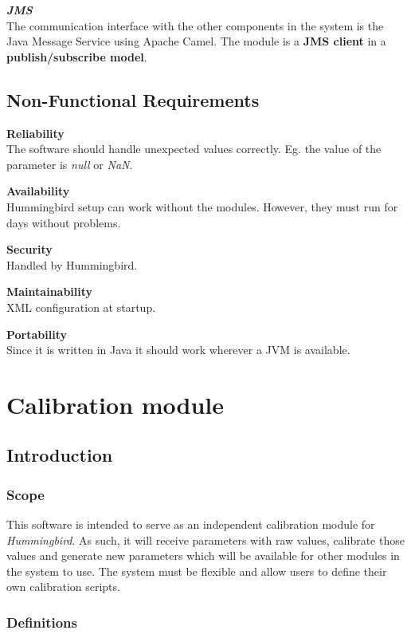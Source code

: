 \textbf{\emph{JMS}} \cite{JMS}\\
The communication interface with the other components in the system is the Java Message Service using Apache Camel. The module is a \textbf{JMS client} in a \textbf{publish/subscribe model}.

\subsection{Non-Functional Requirements}

\textbf{Reliability}\\
The software should handle unexpected values correctly. Eg. the value of the parameter is \emph{null} or \emph{NaN}.

\textbf{Availability}\\
Hummingbird setup can work without the modules. However, they must run for days without problems.

\textbf{Security}\\
Handled by Hummingbird.

\textbf{Maintainability}\\
XML configuration at startup.

\textbf{Portability}\\
Since it is written in Java it should work wherever a JVM is available.

\section{Calibration module}

\subsection{Introduction}

\subsubsection{Scope}

This software is intended to serve as an independent calibration module for \emph{Hummingbird}. As such, it will receive parameters with raw values, calibrate those values and generate new parameters which will be available for other modules in the system to use. The system must be flexible and allow users to define their own calibration scripts.

\subsubsection{Definitions}

